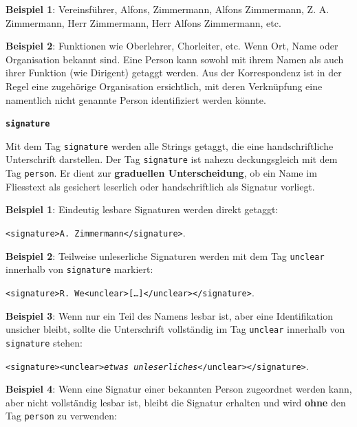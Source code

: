 \documentclass[12pt, a4paper, ngerman, bidi=default]{article}
\begin{document}
\begin{description}
\begin{description}
    \noindent \textbf{ Beispiel 1}: Vereinsführer, Alfons, Zimmermann, Alfons Zimmermann, Z. A. Zimmermann, Herr Zimmermann, Herr Alfons Zimmermann, etc. 

    \textbf{ Beispiel 2}: Funktionen wie Oberlehrer, Chorleiter, etc.
    Wenn Ort, Name oder Organisation bekannt sind. Eine Person kann sowohl mit ihrem Namen als auch ihrer Funktion (wie Dirigent) getaggt werden.  
    Aus der Korrespondenz ist in der Regel eine zugehörige Organisation ersichtlich, mit deren Verknüpfung eine namentlich nicht genannte Person identifiziert werden könnte.

    
    \item\texttt{\textbf{{\colorbox{signature}{signature}}}}
        
    Mit dem Tag \texttt{\colorbox{signature}{signature}} werden alle Strings getaggt, die eine handschriftliche Unterschrift darstellen.  
    Der Tag \texttt{\colorbox{signature}{signature}} ist nahezu deckungsgleich mit dem Tag \texttt{\colorbox{person}{person}}.  
    Er dient zur \textbf{graduellen Unterscheidung}, ob ein Name im Fliesstext als gesichert leserlich oder handschriftlich als Signatur vorliegt.  
    
    \noindent \textbf{ Beispiel 1}: Eindeutig lesbare Signaturen werden direkt getaggt:  

    \colorbox{VeryLightGray}{\texttt{\textless signature\textgreater A. Zimmermann\textless /signature\textgreater}}. 

    \textbf{ Beispiel 2}: Teilweise unleserliche Signaturen werden mit dem Tag \texttt{\colorbox{unclear}{unclear}} innerhalb von \texttt{\colorbox{signature}{signature}} markiert: 

    \colorbox{VeryLightGray}{\texttt{\textless signature\textgreater R. We\textless unclear\textgreater [\ldots]\textless /unclear\textgreater\textless /signature\textgreater}}. 

    
    \textbf{ Beispiel 3}: Wenn nur ein Teil des Namens lesbar ist, aber eine Identifikation unsicher bleibt, sollte die Unterschrift vollständig im Tag \texttt{\colorbox{unclear}{unclear}} innerhalb von \texttt{\colorbox{signature}{signature}} stehen:

    \colorbox{VeryLightGray}{\texttt{\textless signature\textgreater \textless unclear\textgreater \textit{etwas unleserliches}\textless /unclear\textgreater \textless /signature\textgreater}.} 
    
    \textbf{ Beispiel 4}: Wenn eine Signatur einer bekannten Person zugeordnet werden kann, aber nicht vollständig lesbar ist, bleibt die Signatur erhalten und wird \textbf{ohne} den Tag \texttt{\colorbox{person}{person}} zu verwenden: 


\end{description}
\end{description}
\end{document}
